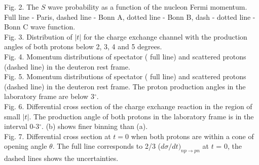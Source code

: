 \noindent
Fig. 2. The $S$ wave probability as a function of the nucleon Fermi momentum.
Full line - Paris, dashed line - Bonn A, dotted line - Bonn B, dash - dotted
line - Bonn C wave function.\\

\noindent
Fig. 3. Distribution of $\vert t \vert$ for the charge exchange channel
 with  the
production angles of both protons below 2, 3, 4 and 5 degrees. \\

\noindent
Fig. 4. Momentum distributions of  spectator ( full line) and
scattered protons (dashed line) in the deuteron rest frame. \\

\noindent
Fig. 5. Momentum distributions of spectator ( full line) and
scattered protons (dashed line) in the deuteron rest frame. The proton
 production angles
in the laboratory frame are below 3$^{\circ}$. \\


\noindent
Fig. 6. Differential cross section of the charge exchange reaction in
the region of small $\vert t \vert$. The production angle of both protons
in the laboratory frame is in the interval 0-3$^{\circ}$. (b) shows
finer binning than (a). \\

\noindent
Fig. 7. Differential cross section at $t=0$ when both protons are within
a cone of opening angle $\theta$. The full line corresponds to 2/3 ($d\sigma/dt)_
{np\to pn}$ at $t$ = 0,  the dashed lines shows the uncertainties. \\

\newpage
